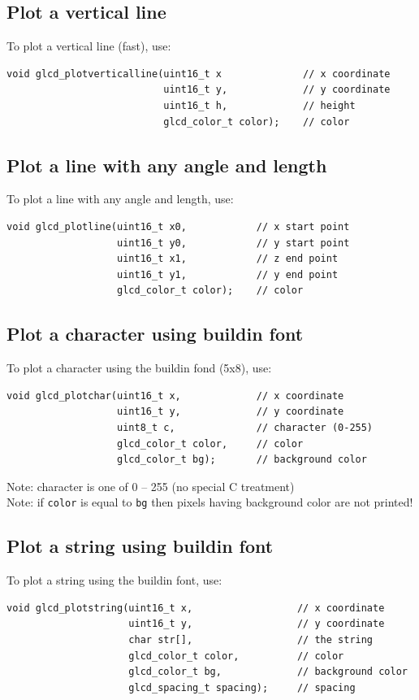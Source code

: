 \documentclass[12pt]{article}
\begin{document}
\subsection{Plot a vertical line}
To plot a vertical line (fast), use:
\begin{lstlisting}
void glcd_plotverticalline(uint16_t x              // x coordinate
                           uint16_t y,             // y coordinate
                           uint16_t h,             // height
                           glcd_color_t color);    // color
\end{lstlisting}

\subsection{Plot a line with any angle and length}
To plot a line with any angle and length, use:
\begin{lstlisting}
void glcd_plotline(uint16_t x0,            // x start point
                   uint16_t y0,            // y start point
                   uint16_t x1,            // z end point
                   uint16_t y1,            // y end point
                   glcd_color_t color);    // color
\end{lstlisting}

\subsection{Plot a character using buildin font}
To plot a character using the buildin fond (5x8), use:
\begin{lstlisting}
void glcd_plotchar(uint16_t x,             // x coordinate
                   uint16_t y,             // y coordinate
                   uint8_t c,              // character (0-255)
                   glcd_color_t color,     // color
                   glcd_color_t bg);       // background color
\end{lstlisting}

Note: character is one of 0 -- 255 (no special C treatment)\\
Note: if \lstinline|color| is equal to \lstinline|bg| then pixels having background color are not printed! 

\subsection{Plot a string using buildin font}
To plot a string using the buildin font, use:
\begin{lstlisting}
void glcd_plotstring(uint16_t x,                  // x coordinate
                     uint16_t y,                  // y coordinate
                     char str[],                  // the string
                     glcd_color_t color,          // color
                     glcd_color_t bg,             // background color
                     glcd_spacing_t spacing);     // spacing
\end{lstlisting}
\end{document}
